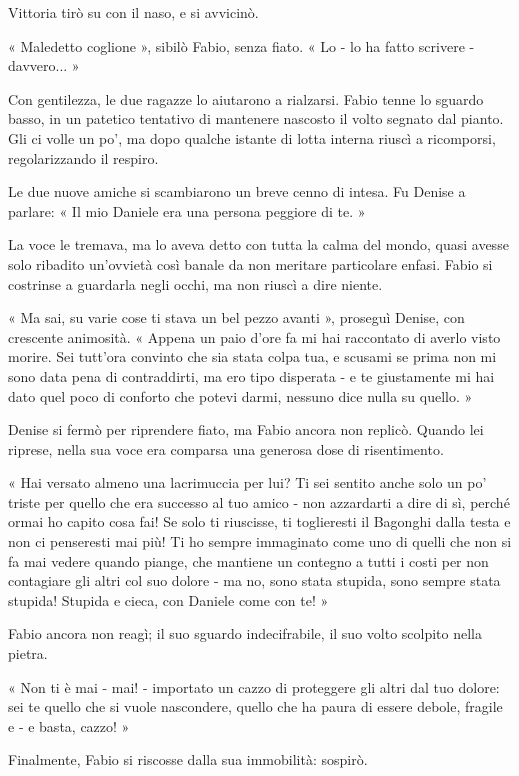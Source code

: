 Vittoria tirò su con il naso, e si avvicinò.

« Maledetto coglione », sibilò Fabio, senza fiato. « Lo - lo ha fatto scrivere - davvero... »

Con gentilezza, le due ragazze lo aiutarono a rialzarsi. Fabio tenne lo sguardo basso, in un patetico tentativo di mantenere nascosto il volto segnato dal pianto. Gli ci volle un po', ma dopo qualche istante di lotta interna riuscì a ricomporsi, regolarizzando il respiro.

Le due nuove amiche si scambiarono un breve cenno di intesa. Fu Denise a parlare: « Il mio Daniele era una persona peggiore di te. »

La voce le tremava, ma lo aveva detto con tutta la calma del mondo, quasi avesse solo ribadito un'ovvietà così banale da non meritare particolare enfasi. Fabio si costrinse a guardarla negli occhi, ma non riuscì a dire niente.

« Ma sai, su varie cose ti stava un bel pezzo avanti », proseguì Denise, con crescente animosità. « Appena un paio d'ore fa mi hai raccontato di averlo visto morire. Sei tutt'ora convinto che sia stata colpa tua, e scusami se prima non mi sono data pena di contraddirti, ma ero tipo disperata - e te giustamente mi hai dato quel poco di conforto che potevi darmi, nessuno dice nulla su quello. »

Denise si fermò per riprendere fiato, ma Fabio ancora non replicò. Quando lei riprese, nella sua voce era comparsa una generosa dose di risentimento.

« Hai versato almeno una lacrimuccia per lui? Ti sei sentito anche solo un po' triste per quello che era successo al tuo amico - non azzardarti a dire di sì, perché ormai ho capito cosa fai! Se solo ti riuscisse, ti toglieresti il Bagonghi dalla testa e non ci penseresti mai più! Ti ho sempre immaginato come uno di quelli che non si fa mai vedere quando piange, che mantiene un contegno a tutti i costi per non contagiare gli altri col suo dolore - ma no, sono stata stupida, sono sempre stata stupida! Stupida e cieca, con Daniele come con te! »

Fabio ancora non reagì; il suo sguardo indecifrabile, il suo volto scolpito nella pietra.

« Non ti è mai - mai! - importato un cazzo di proteggere gli altri dal tuo dolore: sei te quello che si vuole nascondere, quello che ha paura di essere debole, fragile e - e basta, cazzo! »

Finalmente, Fabio si riscosse dalla sua immobilità: sospirò.

